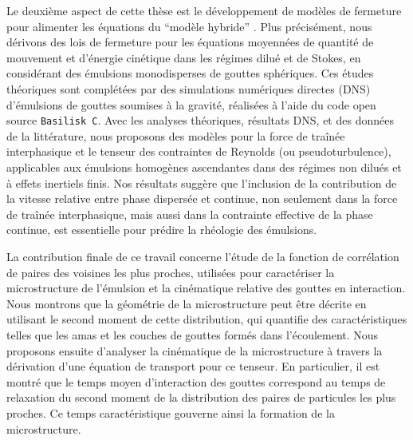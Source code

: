 Le deuxi\`eme aspect de cette th\`ese est le d\'eveloppement de mod\`eles de fermeture pour alimenter les \'equations du  ``mod\`ele hybride'' .
Plus pr\'ecis\'ement, nous d\'erivons des lois de fermeture pour les \'equations moyenn\'ees de quantit\'e de mouvement et d'\'energie cin\'etique dans les r\'egimes dilu\'e et de Stokes, en consid\'erant des \'emulsions monodisperses de gouttes sph\'eriques.
Ces \'etudes th\'eoriques sont compl\'et\'ees par des simulations num\'eriques directes (DNS) d'\'emulsions de gouttes soumises \`a la gravit\'e, r\'ealis\'ees \`a l'aide du code open source \texttt{Basilisk C}.
Avec les analyses th\'eoriques, r\'esultats DNS, et des donn\'ees de la litt\'erature, nous proposons des mod\`eles pour la force de traîn\'ee interphasique et le tenseur des contraintes de Reynolds (ou pseudoturbulence), applicables aux \'emulsions homog\`enes ascendantes dans des r\'egimes non dilu\'es et \`a effets inertiels finis.
Nos r\'esultats sugg\`ere que l'inclusion de la contribution de la vitesse relative entre phase dispers\'ee et continue, non seulement dans la force de traîn\'ee interphasique, mais aussi dans la contrainte effective de la phase continue, est essentielle pour pr\'edire la rh\'eologie des \'emulsions.

La contribution finale de ce travail concerne l'\'etude de la fonction de corrélation de paires des voisines les plus proches, utilis\'ees pour caract\'eriser la microstructure de l'\'emulsion et la cin\'ematique relative des gouttes en interaction.
Nous montrons que la g\'eom\'etrie de la microstructure peut \^etre d\'ecrite en utilisant le second moment de cette distribution, qui quantifie des caract\'eristiques telles que les amas et les couches de gouttes form\'es dans l'\'ecoulement.
Nous proposons ensuite d'analyser la cin\'ematique de la microstructure \`a travers la d\'erivation d'une \'equation de transport pour ce tenseur.
En particulier, il est montr\'e que le temps moyen d'interaction des gouttes correspond au temps de relaxation du second moment de la distribution des paires de particules les plus proches.
Ce temps caract\'eristique gouverne ainsi la formation de la microstructure.
